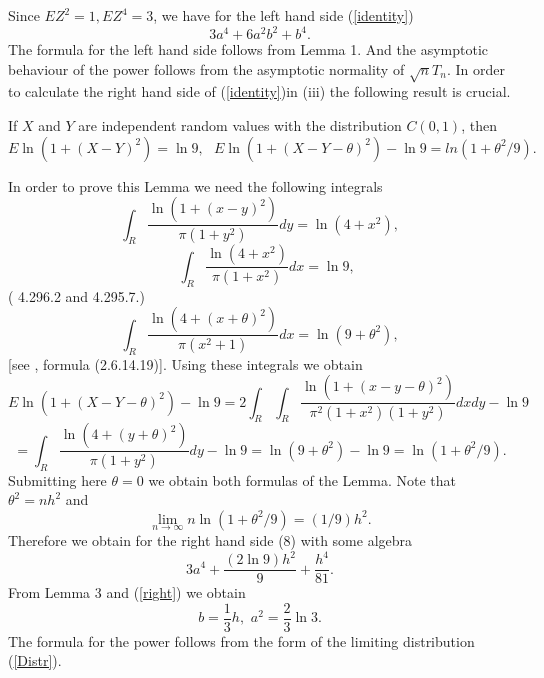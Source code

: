 \documentclass{svproc}
\begin{document}
Since $E Z^2=1, EZ^4=3$,  we have for the left hand side (\ref{identity})
\begin{equation}\label{left}
3a^4 + 6a^2b^2 + b^4.
 \end{equation}
 The formula for the left hand side follows from Lemma 1.
 And the asymptotic behaviour of the power follows from the asymptotic normality of $\sqrt nT_n$.
In order to calculate the right hand side of  (\ref{identity})in (iii)
 the following result is crucial.
\begin{lemma}If $X$ and $Y$ are independent random values with the distribution
$C(0,1)$, then
$$
 E \ln(1+ (X- Y)^2)= \ln 9,\,\,\,\,
 E \ln(1+ (X- Y - \theta)^2)-\ln 9
 =
ln(1+ \theta^2/9).
$$
\end{lemma}
In order to prove this Lemma we need the following integrals
$$
\int_{R}
\frac {\ln(1+(x-y)^2)}{\pi(1+y^2)} dy = \ln(4+x^2),
$$
$$
\quad \int_{R} \frac {\ln(4+x^2)}{\pi(1+x^2)} dx = \ln 9,
$$
(\cite{GradRyzh2007}  4.296.2 and 4.295.7.)
$$
\int_{R} \frac{\ln(4 +(x +\theta)^2 )}{\pi(x^2 +1)} dx = \ln(9+\theta^2),
$$
[see  \cite{PrudBrychMarich1981}, formula (2.6.14.19)].
Using these integrals we obtain
$$
 E \ln(1+ (X- Y - \theta)^2)-\ln 9  = 2\int_{R} \int_{R} \frac{\ln(1+(x-y-\theta)^2)}{\pi^2(1+x^2)(1+y^2)} dx dy -\ln 9
$$
$$
= \int_{R}\frac{\ln(4 +(y+\theta)^2)}{\pi(1+y^2)} dy- \ln 9= \ln(9+\theta^2) -\ln 9 = \ln(1+ \theta^2/9).
$$
Submitting here  $\theta=0$ we obtain both formulas of the Lemma.
Note that $\theta^2=nh^2$ and
$$
\lim_{n\to \infty} n \ln(1+ \theta^2/9)= (1/9)h^2.
$$
Therefore we obtain for the right hand side (8) with some algebra
\begin{equation}\label{right}
3a^4 + \frac{(2\ln 9 )h^2}{9} + \frac{h^4}{81}.
 \end{equation}
 From Lemma 3 and  (\ref{right}) we obtain
$$
b=\frac{1}{3} h,\,\,a^2=\frac{2}{3}\ln 3.
$$
The formula for the power follows from the form of the limiting distribution  (\ref{Distr}).
\end{document}
